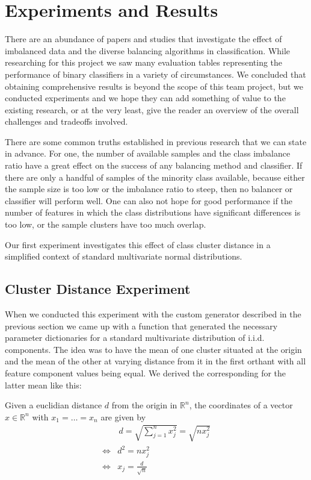 \section{Experiments and Results}

There are an abundance of papers and studies that investigate the effect of imbalanced data and the diverse balancing algorithms in classification.
While researching for this project we saw many evaluation tables representing the performance of binary classifiers in a variety of circumstances.
We concluded that obtaining comprehensive results is beyond the scope of this team project, but we conducted experiments 
and we hope they can add something of value to the existing research, or at the very least, give the reader an overview of the overall challenges and tradeoffs involved.

There are some common truths established in previous research that we can state in advance.
For one, the number of available samples and the class imbalance ratio have a great effect on the success of any balancing method and classifier.
If there are only a handful of samples of the minority class available, because either the sample size is too low or the imbalance ratio to steep,
then no balancer or classifier will perform well.
One can also not hope for good performance if the number of features in which the class distributions have significant differences is too low, or
the sample clusters have too much overlap.

Our first experiment investigates this effect of class cluster distance in a simplified context of standard multivariate normal distributions.


\subsection{Cluster Distance Experiment}

When we conducted this experiment with the custom generator described in the previous section we came up with a function 
that generated the necessary parameter dictionaries for a standard multivariate distribution of i.i.d. components.
The idea was to have the mean of one cluster situated at the origin and the mean of the other at varying distance from it in the first orthant with all feature component
values being equal. We derived the corresponding for the latter mean like this:

Given a euclidian distance $d$ from the origin in $\mathbb{R}^n$, the coordinates of a vector $x \in \mathbb{R}^n$ with $x_1 = \dots = x_n$ are given by
\[
\begin{aligned}
	& \, d = \sqrt{ \sum_{j =1}^n x_j^2} = \sqrt{ n x_j^2} \\
	\Leftrightarrow& d^2 = n x_j^2 \\ 
	\Leftrightarrow& x_j = \frac{d}{\sqrt{n}} \\ 
\end{aligned}
\]

